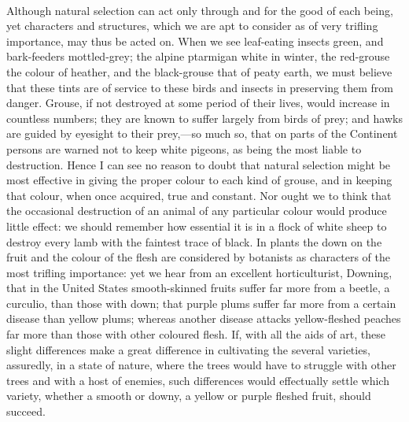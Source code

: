 \documentclass{article}
\begin{document}
\\
Although natural selection can act only through and for the good of each being, yet characters and structures, which we are apt to consider as of very trifling importance, may thus be acted on. When we see leaf-eating insects green, and bark-feeders mottled-grey; the alpine ptarmigan white in winter, the red-grouse the colour of heather, and the black-grouse that of peaty earth, we must believe that these tints are of service to these birds and insects in preserving them from danger. Grouse, if not destroyed at some period of their lives, would increase in countless numbers; they are known to suffer largely from birds of prey; and hawks are guided by eyesight to their prey,—so much so, that on parts of the Continent persons are warned not to keep white pigeons, as being the most liable to destruction. Hence I can see no reason to doubt that natural selection might be most effective in giving the proper colour to each kind of grouse, and in keeping that colour, when once acquired, true and constant. Nor ought we to think that the occasional destruction of an animal of any particular colour would produce little effect: we should remember how essential it is in a flock of white sheep to destroy every lamb with the faintest trace of black. In plants the down on the fruit and the colour of the flesh are considered by botanists as characters of the most trifling importance: yet we hear from an excellent horticulturist, Downing, that in the United States smooth-skinned fruits suffer far more from a beetle, a curculio, than those with down; that purple plums suffer far more from a certain disease than yellow plums; whereas another disease attacks yellow-fleshed peaches far more than those with other coloured flesh. If, with all the aids of art, these slight differences make a great difference in cultivating the several varieties, assuredly, in a state of nature, where the trees would have to struggle with other trees and with a host of enemies, such differences would effectually settle which variety, whether a smooth or downy, a yellow or purple fleshed fruit, should succeed.\\
\end{document}
